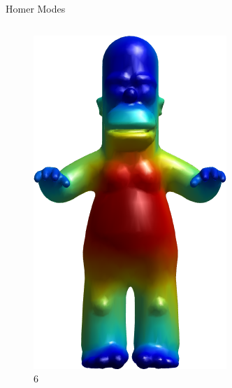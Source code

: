 \documentclass{beamer}
\begin{document}
\begin{frame}{Homer Modes}

\begin{columns}
\begin{column}[T]{3cm}
\begin{figure}[t]
    \includegraphics[width=\textwidth]{Harmonics/HomerModes/6.png}
    \caption*{\huge 6}
\end{figure}
\end{column}
\begin{column}[T]{3cm}
\begin{figure}[t]


\end{figure}
\end{column}
\end{columns}
\end{frame}
\end{document}
